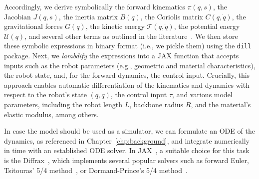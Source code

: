 Accordingly, we derive symbolically the forward kinematics $\pi(q, s)$, the Jacobian $J(q, s)$, the inertia matrix $B(q)$, the Coriolis matrix $C(q, \dot{q})$, the gravitational forces $G(q)$, the kinetic energy $\mathcal{T}(q, \dot{q})$, the potential energy $\mathcal{U}(q)$, and several other terms as outlined in the literature~\citep{della2023model, stolzle2024experimental}. We then store these symbolic expressions in binary format (i.e., we pickle them) using the \texttt{dill} package. Next, we \emph{lambdify} the expressions into a JAX function that accepts inputs such as the robot parameters (e.g., geometric and material characteristics), the robot state, and, for the forward dynamics, the control input. Crucially, this approach enables automatic differentiation of the kinematics and dynamics with respect to the robot’s state $(q, \dot{q})$, the control input $\tau$, and various model parameters, including the robot length $L$, backbone radius $R$, and the material’s elastic modulus, among others.

In case the model should be used as a simulator, we can formulate an \gls{ODE} of the dynamics, as referenced in Chapter~\ref{chp:background}, and integrate numerically in time with an established \gls{ODE} solver. In JAX~\citep{jax2018github}, a suitable choice for this task is the Diffrax~\citep{kidger2021neural}, which implements several popular solvers such as forward Euler, Tsitouras' 5/4 method~\citep{tsitouras2011runge}, or Dormand-Prince's 5/4 method~\citep{dormand1980family}.

